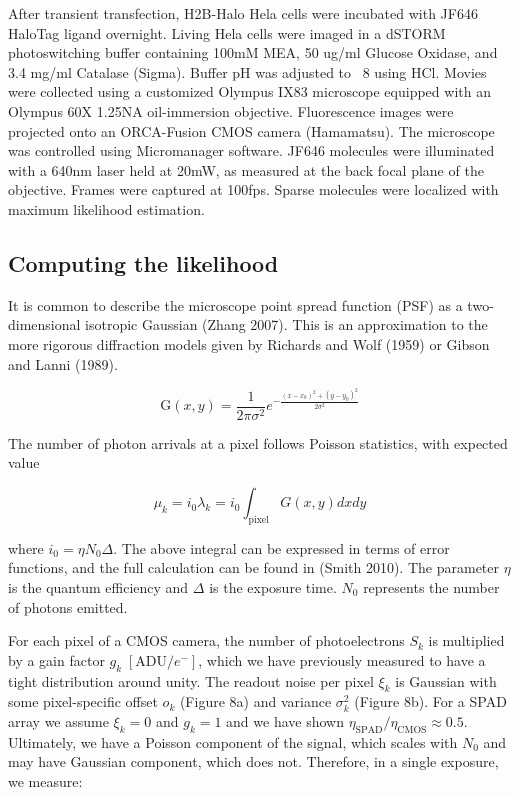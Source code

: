 \documentclass{ucetd}
\begin{document}
After transient transfection, H2B-Halo Hela cells were incubated with JF646 HaloTag ligand overnight. Living Hela cells were imaged in a dSTORM photoswitching buffer containing 100mM MEA, 50 ug/ml Glucose Oxidase, and 3.4 mg/ml Catalase (Sigma). Buffer pH was adjusted to ~8 using HCl. Movies were collected using a customized Olympus IX83 microscope equipped with an Olympus 60X 1.25NA oil-immersion objective. Fluorescence images were projected onto an ORCA-Fusion CMOS camera (Hamamatsu). The microscope was controlled using Micromanager software. JF646 molecules were illuminated with a 640nm laser held at 20mW, as measured at the back focal plane of the objective.  Frames were captured at 100fps. Sparse molecules were localized with maximum likelihood estimation. 

\subsection{Computing the likelihood}

It is common to describe the microscope point spread function (PSF) as a two-dimensional isotropic Gaussian (Zhang 2007). This is an approximation to the more rigorous diffraction models given by Richards and Wolf (1959) or Gibson and Lanni (1989). 

\begin{equation*}
\mathrm{G}(x,y) = \frac{1}{2\pi\sigma^{2}}e^{-\frac{(x-x_{0})^{2}+(y-y_{0})^{2}}{2\sigma^{2}}}
\end{equation*}

The number of photon arrivals at a pixel follows Poisson statistics, with expected value

\begin{equation}
\mu_{k} = i_{0}\lambda_{k} = i_{0}\int_{\mathrm{pixel}} G(x,y)dxdy
\end{equation}

where $i_{0} = \eta N_{0}\Delta$. The above integral can be expressed in terms of error functions, and the full calculation can be found in (Smith 2010). The parameter $\eta$ is the quantum efficiency and $\Delta$ is the exposure time. $N_{0}$ represents the number of photons emitted.

For each pixel of a CMOS camera, the number of photoelectrons $S_{k}$ is  multiplied by a gain factor $g_{k} \;[\mathrm{ADU}/e^{-}]$, which we have previously measured to have a tight distribution around unity. The readout noise per pixel $\xi_{k}$ is Gaussian with some pixel-specific offset $o_{k}$ (Figure 8a) and variance $\sigma_{k}^{2}$ (Figure 8b). For a SPAD array we assume $\xi_{k}=0$ and $g_{k}=1$ and we have shown $\eta_{\mathrm{SPAD}}/\eta_{\mathrm{CMOS}} \approx 0.5$. Ultimately, we have a Poisson component of the signal, which scales with $N_{0}$ and may have Gaussian component, which does not. Therefore, in a single exposure, we measure: 
\end{document}
